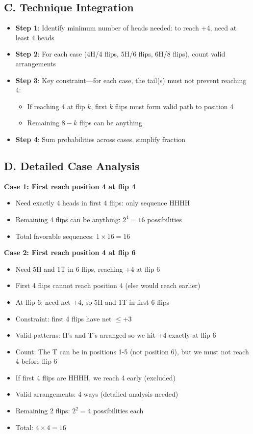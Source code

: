 \documentclass[]{article}
\begin{document}
\subsection*{C. Technique Integration}
\begin{itemize}[leftmargin=*]
    \item \textbf{Step 1}: Identify minimum number of heads needed: to reach +4, need at least 4 heads
    \item \textbf{Step 2}: For each case (4H/4 flips, 5H/6 flips, 6H/8 flips), count valid arrangements
    \item \textbf{Step 3}: Key constraint—for each case, the tail(s) must not prevent reaching 4:
    \begin{itemize}
        \item If reaching 4 at flip $k$, first $k$ flips must form valid path to position 4
        \item Remaining $8-k$ flips can be anything
    \end{itemize}
    \item \textbf{Step 4}: Sum probabilities across cases, simplify fraction
\end{itemize}

\subsection*{D. Detailed Case Analysis}

\textbf{Case 1: First reach position 4 at flip 4}
\begin{itemize}
    \item Need exactly 4 heads in first 4 flips: only sequence HHHH
    \item Remaining 4 flips can be anything: $2^4 = 16$ possibilities
    \item Total favorable sequences: $1 \times 16 = 16$
\end{itemize}

\textbf{Case 2: First reach position 4 at flip 6}
\begin{itemize}
    \item Need 5H and 1T in 6 flips, reaching +4 at flip 6
    \item First 4 flips cannot reach position 4 (else would reach earlier)
    \item At flip 6: need net +4, so 5H and 1T in first 6 flips
    \item Constraint: first 4 flips have net $\leq +3$
    \item Valid patterns: H's and T's arranged so we hit +4 exactly at flip 6
    \item Count: The T can be in positions 1-5 (not position 6), but we must not reach 4 before flip 6
    \item If first 4 flips are HHHH, we reach 4 early (excluded)
    \item Valid arrangements: 4 ways (detailed analysis needed)
    \item Remaining 2 flips: $2^2 = 4$ possibilities each
    \item Total: $4 \times 4 = 16$
\end{itemize}
\end{document}
